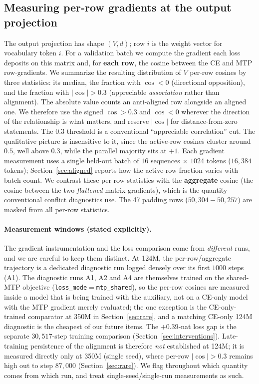 \subsection{Measuring per-row gradients at the output projection}
\label{sec:instrument}
The output projection has shape $(V, d)$; row $i$ is the weight vector for
vocabulary token $i$. For a validation batch we compute the gradient each loss
deposits on this matrix and, for \textbf{each row}, the cosine between the CE and
MTP row-gradients. We summarize the resulting distribution of $V$ per-row cosines
by three statistics: its median, the fraction with $\cos < 0$ (directional
opposition), and the fraction with $|\cos| > 0.3$ (appreciable
\emph{association} rather than alignment). The absolute value counts an
anti-aligned row alongside an aligned one. We therefore use the signed
$\cos > 0.3$ and $\cos < 0$ wherever the direction of the relationship is what
matters, and reserve $|\cos|$ for distance-from-zero statements. The $0.3$
threshold is a conventional ``appreciable correlation'' cut. The qualitative
picture is insensitive to it, since the active-row cosines cluster around $0.5$,
well above $0.3$, while the parallel majority sits at $+1$. Each gradient measurement uses a
single held-out batch of $16$ sequences $\times$ $1024$ tokens ($16{,}384$ tokens);
Section~\ref{sec:aligned} reports how the active-row fraction varies with batch
count. We contrast these per-row
statistics with the \textbf{aggregate} cosine (the cosine between the two
\emph{flattened} matrix gradients), which is the quantity conventional conflict
diagnostics use. The 47 padding rows ($50{,}304 - 50{,}257$) are masked from all
per-row statistics.

\paragraph{Measurement windows (stated explicitly).} The gradient
instrumentation and the loss comparison come from \emph{different} runs, and we
are careful to keep them distinct. At 124M, the per-row/aggregate trajectory is a
dedicated diagnostic run logged densely over its first $1000$ steps (A1). The
diagnostic runs A1, A2 and A4 are themselves trained on the shared-MTP objective
(\texttt{loss\_mode}${=}$\texttt{mtp\_shared}), so the per-row cosines are measured
inside a model that is being trained with the auxiliary, not on a CE-only model with
the MTP gradient merely evaluated; the one exception is the CE-only-trained
comparator at 350M in Section~\ref{sec:rare}, and a matching CE-only 124M diagnostic
is the cheapest of our future items. The
$+0.39$-nat loss gap is the separate $30{,}517$-step training comparison
(Section~\ref{sec:interventions}). Late-training persistence of the alignment is
therefore \emph{not} established at 124M; it is measured directly only at 350M
(single seed), where per-row $|\cos|>0.3$ remains high out to step $87{,}000$
(Section~\ref{sec:rare}). We flag throughout which quantity comes from which run,
and treat single-seed/single-run measurements as such.

